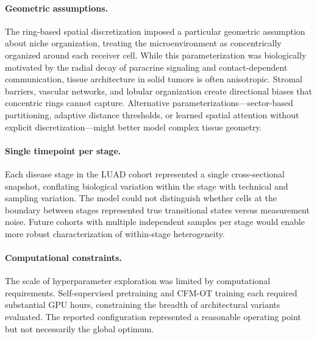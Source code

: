 \paragraph{Geometric assumptions.} The ring-based spatial discretization imposed a particular geometric assumption about niche organization, treating the microenvironment as concentrically organized around each receiver cell. While this parameterization was biologically motivated by the radial decay of paracrine signaling and contact-dependent communication, tissue architecture in solid tumors is often anisotropic. Stromal barriers, vascular networks, and lobular organization create directional biases that concentric rings cannot capture. Alternative parameterizations---sector-based partitioning, adaptive distance thresholds, or learned spatial attention without explicit discretization---might better model complex tissue geometry.

\paragraph{Single timepoint per stage.} Each disease stage in the LUAD cohort represented a single cross-sectional snapshot, conflating biological variation within the stage with technical and sampling variation. The model could not distinguish whether cells at the boundary between stages represented true transitional states versus measurement noise. Future cohorts with multiple independent samples per stage would enable more robust characterization of within-stage heterogeneity.

\paragraph{Computational constraints.} The scale of hyperparameter exploration was limited by computational requirements. Self-supervised pretraining and CFM-OT training each required substantial GPU hours, constraining the breadth of architectural variants evaluated. The reported configuration represented a reasonable operating point but not necessarily the global optimum.

